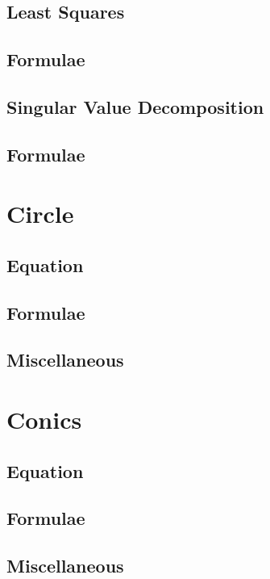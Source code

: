 \documentclass[journal]{IEEEtran}
\begin{document}
\subsection{Least Squares}

\subsection{Formulae}

\subsection{Singular Value Decomposition}

\subsection{Formulae}

\newpage
\section{Circle}
\subsection{Equation}

\subsection{Formulae}

\subsection{Miscellaneous}

\newpage
\section{Conics}
\subsection{Equation}

\subsection{Formulae}

\subsection{Miscellaneous}

\newpage
\end{document}
